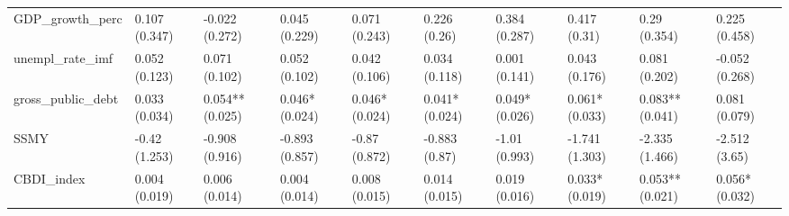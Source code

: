 \begin{table}[ht]
\begin{tabular}{llllllllll}
  GDP\_growth\_perc & 0.107 (0.347) & -0.022 (0.272) & 0.045 (0.229) & 0.071 (0.243) & 0.226 (0.26) & 0.384 (0.287) & 0.417 (0.31) & 0.29 (0.354) & 0.225 (0.458) \\ 
  unempl\_rate\_imf & 0.052 (0.123) & 0.071 (0.102) & 0.052 (0.102) & 0.042 (0.106) & 0.034 (0.118) & 0.001 (0.141) & 0.043 (0.176) & 0.081 (0.202) & -0.052 (0.268) \\ 
  gross\_public\_debt & 0.033 (0.034) & 0.054** (0.025) & 0.046* (0.024) & 0.046* (0.024) & 0.041* (0.024) & 0.049* (0.026) & 0.061* (0.033) & 0.083** (0.041) & 0.081 (0.079) \\ 
  SSMY & -0.42 (1.253) & -0.908 (0.916) & -0.893 (0.857) & -0.87 (0.872) & -0.883 (0.87) & -1.01 (0.993) & -1.741 (1.303) & -2.335 (1.466) & -2.512 (3.65) \\ 
  CBDI\_index & 0.004 (0.019) & 0.006 (0.014) & 0.004 (0.014) & 0.008 (0.015) & 0.014 (0.015) & 0.019 (0.016) & 0.033* (0.019) & 0.053** (0.021) & 0.056* (0.032) \\ 
   \bottomrule
\end{tabular}
\endgroup
\end{table}
